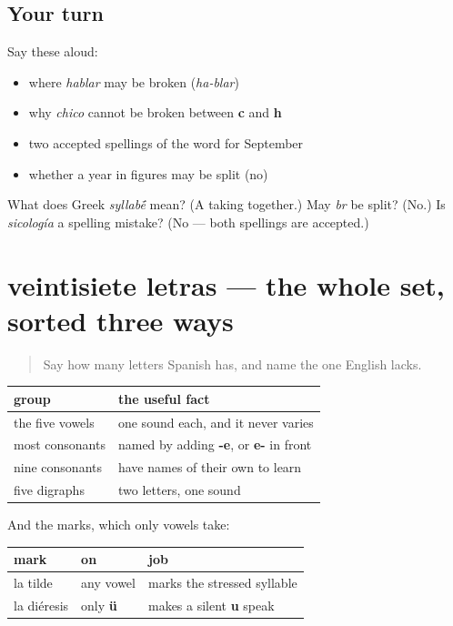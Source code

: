 \subsection*{Your turn}
Say these aloud:

\begin{itemize}
\raggedright
  \item where \emph{hablar} may be broken (\emph{ha-blar})
  \item why \emph{chico} cannot be broken between \textbf{c} and \textbf{h}
  \item two accepted spellings of the word for September
  \item whether a year in figures may be split (no)
\end{itemize}

\begin{tcolorbox}[breakable,colback=teal!4,colframe=teal!35!black,title={Before you move on}]
What does Greek \emph{syllab\'{\={e}}} mean? (A taking together.) May \emph{br} be split? (No.) Is \emph{sicología} a spelling mistake? (No — both spellings are accepted.)
\end{tcolorbox}
\section[veintisiete letras]{veintisiete letras — the whole set, sorted three ways}

\label{lesson:ES-C425-repaso-letras}



\begin{quote}
Say how many letters Spanish has, and name the one English lacks.
\end{quote}

\begin{grammarlens}[title={Grammar Lens: what you now know about each group}]
\noindent
\begin{tabularx}{\linewidth}{@{}>{\raggedright\arraybackslash}X>{\raggedright\arraybackslash}X@{}}
\toprule
\textbf{group} & \textbf{the useful fact} \\
\midrule
the five vowels & one sound each, and it never varies \\
most consonants & named by adding \textbf{-e}, or \textbf{e-} in front \\
nine consonants & have names of their own to learn \\
five digraphs & two letters, one sound \\
\bottomrule
\end{tabularx}

And the marks, which only vowels take:

\noindent
\begin{tabularx}{\linewidth}{@{}>{\raggedright\arraybackslash}X>{\raggedright\arraybackslash}X>{\raggedright\arraybackslash}X@{}}
\toprule
\textbf{mark} & \textbf{on} & \textbf{job} \\
\midrule
la tilde & any vowel & marks the stressed syllable \\
la diéresis & only \textbf{ü} & makes a silent \textbf{u} speak \\
\bottomrule
\end{tabularx}
\end{grammarlens}

